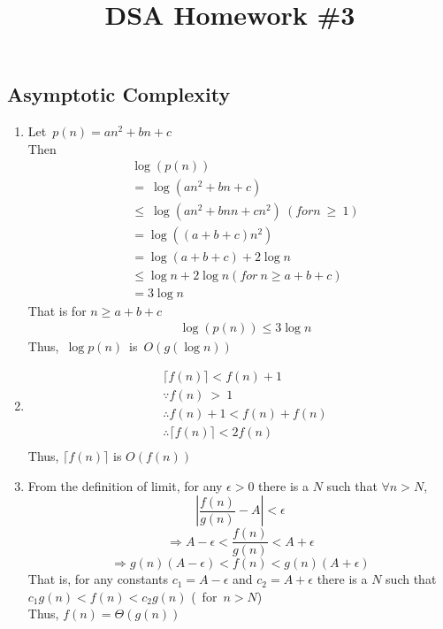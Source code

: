 \documentclass[fleqn,a4paper,12pt]{article}
\title{DSA Homework \#3}
\date{}
\begin{document}
\maketitle
\thispagestyle{fancy}
\subsection{Asymptotic Complexity}

\begin{enumerate}

\item
  Let\ $p(n)=a n^2 + b n + c $\\
  Then
  \begin{align*}
    &\log (p(n))\\
    &=\ \log( a n^2 + b n + c ) \\
    &\leq \ \log( a n^2 + b n  n + c  n^2 )\ ( for n\ \geq\ 1)\\
    &= \log( ( a + b + c ) n^2 )\\
    &= \log(a + b + c) + 2\log n\\ 
    &\leq \log n + 2\log n ( for\ n \geq a + b + c )\\
    &= 3\log n
  \end{align*}
  That is for $n \geq a+b+c $
  \begin{align*}
    &\log (p(n)) \leq 3\log n
  \end{align*}
  Thus,\ $\log p(n)$\ is\ $O(g(\log n))$\\

\item
  \begin{align*}
    &\lceil f(n) \rceil < f(n) + 1 \\
    &\because f(n)\ >\ 1 \\
    &\therefore f(n) + 1 < f(n) + f(n) \\
    &\therefore \lceil f(n) \rceil  < 2 f(n) \\
  \end{align*}
  Thus, $\lceil f(n) \rceil$ is $O(f(n))$\\

\item
  From the definition of limit, for any $\epsilon > 0$ there is a $N$ such that $\forall n>N $,\\
  \[ |\frac{f(n)}{g(n)} - A|  < \epsilon \]
  \[ \Rightarrow A - \epsilon <  \frac{f(n)}{g(n)} < A + \epsilon \] 
  \[ \Rightarrow  g(n) (A - \epsilon) < f(n) < g(n) (A + \epsilon) \] 
  That is, for any constants $c_1=A - \epsilon$ and $c_2=A + \epsilon$ there is a $N$ such that\\
  $ c_1g(n) < f(n) < c_2g(n) $ (\ for\ $n>N$) \\
  Thus, $f(n)=\Theta (g(n))$\\


\end{enumerate}
\end{document}
